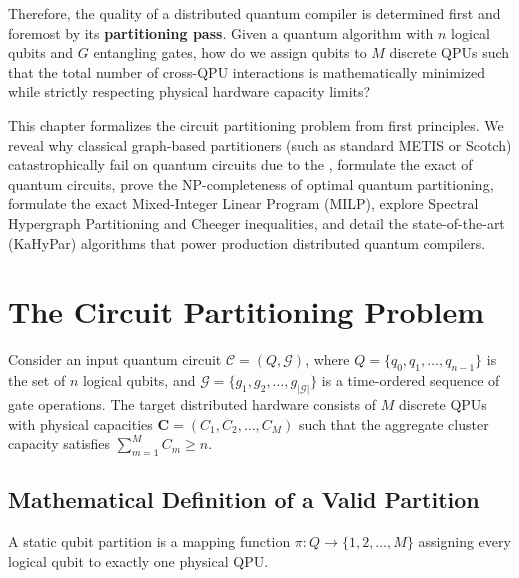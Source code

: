 Therefore, the quality of a distributed quantum compiler is determined first and foremost by its \textbf{partitioning pass}. Given a quantum algorithm with $n$ logical qubits and $G$ entangling gates, how do we assign qubits to $M$ discrete QPUs such that the total number of cross-QPU interactions is mathematically minimized while strictly respecting physical hardware capacity limits?

This chapter formalizes the circuit partitioning problem from first principles. We reveal why classical graph-based partitioners (such as standard METIS or Scotch) catastrophically fail on quantum circuits due to the , formulate the exact  of quantum circuits, prove the NP-completeness of optimal quantum partitioning, formulate the exact Mixed-Integer Linear Program (MILP), explore Spectral Hypergraph Partitioning and Cheeger inequalities, and detail the state-of-the-art  (KaHyPar) algorithms that power production distributed quantum compilers.

\section{The Circuit Partitioning Problem}
\label{sec:partitioning_formulation}

Consider an input quantum circuit $\mathcal{C} = (Q, \mathcal{G})$, where $Q = \{q_0, q_1, \dots, q_{n-1}\}$ is the set of $n$ logical qubits, and $\mathcal{G} = \{g_1, g_2, \dots, g_{|\mathcal{G}|}\}$ is a time-ordered sequence of gate operations. The target distributed hardware consists of $M$ discrete QPUs with physical capacities $\bm{C} = (C_1, C_2, \dots, C_M)$ such that the aggregate cluster capacity satisfies $\sum_{m=1}^M C_m \ge n$.

\subsection{Mathematical Definition of a Valid Partition}
A static qubit partition is a mapping function $\pi: Q \to \{1, 2, \dots, M\}$ assigning every logical qubit to exactly one physical QPU.

